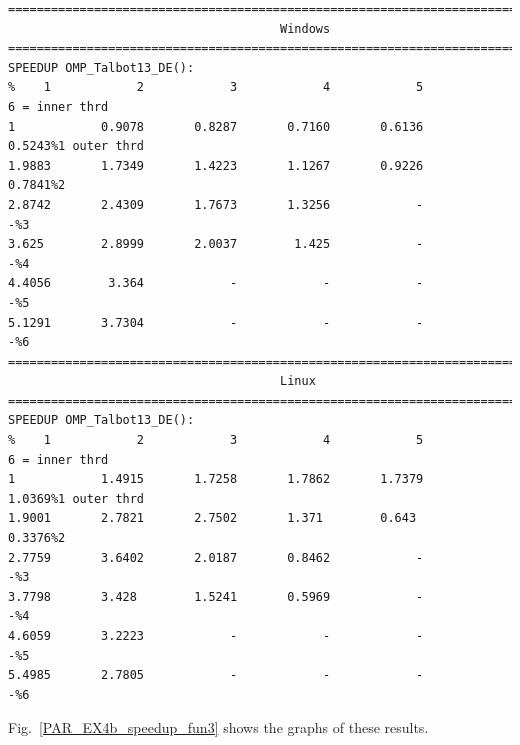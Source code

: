 \documentclass[a4paper,10pt]{report}%
\begin{document}
\begin{lstlisting}
====================================================================================
                                      Windows
====================================================================================
SPEEDUP OMP_Talbot13_DE():
%    1            2            3            4            5            6 = inner thrd
1            0.9078       0.8287       0.7160       0.6136       0.5243%1 outer thrd
1.9883       1.7349       1.4223       1.1267       0.9226       0.7841%2
2.8742       2.4309       1.7673       1.3256            -            -%3
3.625        2.8999       2.0037        1.425            -            -%4
4.4056        3.364            -            -            -            -%5
5.1291       3.7304            -            -            -            -%6
====================================================================================
                                      Linux
====================================================================================
SPEEDUP OMP_Talbot13_DE():
%    1            2            3            4            5            6 = inner thrd
1            1.4915       1.7258       1.7862       1.7379       1.0369%1 outer thrd
1.9001       2.7821       2.7502       1.371        0.643        0.3376%2
2.7759       3.6402       2.0187       0.8462            -            -%3
3.7798       3.428        1.5241       0.5969            -            -%4
4.6059       3.2223            -            -            -            -%5
5.4985       2.7805            -            -            -            -%6
\end{lstlisting}
Fig.~\ref{PAR_EX4b_speedup_fun3} shows the graphs of these results.
\end{document}
